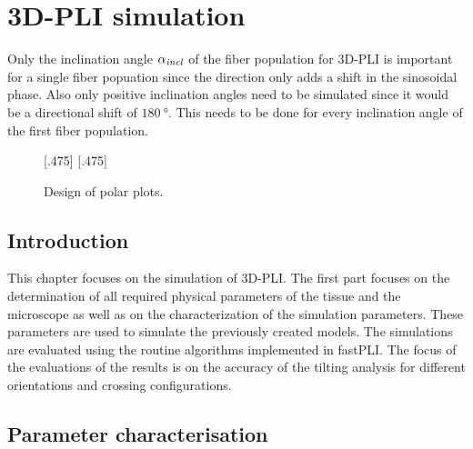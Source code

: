 \cleardoublepage
\setcounter{chapter}{8}
\chapter{3D-PLI simulation}
\label{cha:simulation_analysis}
%
Only the inclination angle $\textnormal{$\alpha_{\mathit{incl}}$}$ of the fiber population for \ac{3D-PLI} is important for a single fiber popuation since the direction only adds a shift in the sinosoidal phase.
Also only positive inclination angles need to be simulated since it would be a directional shift of $\SI{180}{\degree}$.
This needs to be done for every inclination angle of the first fiber population.
\begin{figure}[t]
\centering
\setlength{\tikzwidth}{0.40\textwidth}
[.475\textwidth]{}\hfill
{}
[.475\textwidth]{}
\caption{Design of polar plots.}
\label{fig:polarplotdesign}
\end{figure}
% 
%
\section{Introduction}
%
This chapter focuses on the simulation of \ac{3D-PLI}.
The first part focuses on the determination of all required physical parameters of the tissue and the microscope as well as on the characterization of the simulation parameters.
These parameters are used to simulate the previously created models.
The simulations are evaluated using the routine algorithms implemented in \ac{fastPLI}.
The focus of the evaluations of the results is on the accuracy of the tilting analysis for different orientations and crossing configurations.
%
%
%
\section{Parameter characterisation}\label{sec:sim_choose_parameters}
%
